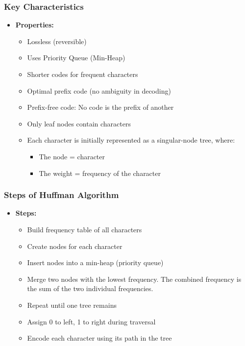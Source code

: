 \documentclass[10pt,aspectratio=43]{beamer}
\begin{document}
\begin{frame}
    \frametitle{\textcolor{myMaroon}{Key Characteristics}}

    \begin{itemize}
    \item \textcolor{myMaroon}{\textbf{Properties:}} 
    \begin{itemize}
        \item Lossless (reversible)
        \item Uses Priority Queue (Min-Heap)
        \item Shorter codes for frequent characters
        \item Optimal prefix code (no ambiguity in decoding)
        \item Prefix-free code: No code is the prefix of another
        \item Only leaf nodes contain characters
        \item Each character is initially represented as a singular-node tree, where:
        \begin{itemize}
            
            \item The node = character
            \item The weight = frequency of the character
            \end{itemize}
    \end{itemize}
    \end{itemize}
\end{frame}



\begin{frame}
    \frametitle{Steps of Huffman Algorithm}
    \begin{itemize}
    \item \textcolor{myMaroon}{\textbf{Steps:}} 
    \begin{itemize}
        \item Build frequency table of all characters
        \item Create nodes for each character
        \item Insert nodes into a min-heap (priority queue)
        \item Merge two nodes with the lowest frequency. The combined frequency is the sum of the two individual frequencies.
        \item Repeat until one tree remains
        \item Assign 0 to left, 1 to right during traversal
        \item Encode each character using its path in the tree
    \end{itemize}
    \end{itemize}
\end{frame}
\end{document}

